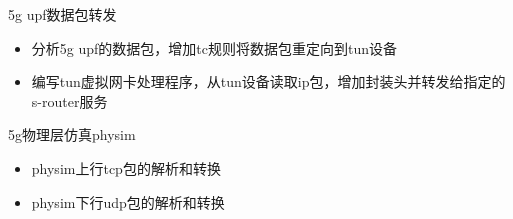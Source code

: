   \item 5g upf数据包转发
  \begin{itemize}
    \item 分析5g upf的数据包，增加tc规则将数据包重定向到tun设备
    \item 编写tun虚拟网卡处理程序，从tun设备读取ip包，增加封装头并转发给指定的s-router服务
  \end{itemize}
  \item 5g物理层仿真physim
  \begin{itemize}
    \item physim上行tcp包的解析和转换
    \item physim下行udp包的解析和转换
  \end{itemize}

